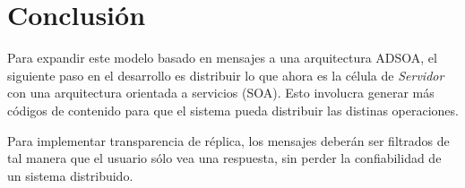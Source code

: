 \documentclass[conference,compsoc]{IEEEtran}
\begin{document}
\section{Conclusión}

Para expandir este modelo basado en mensajes a una arquitectura ADSOA, el siguiente paso en el desarrollo es distribuir lo que ahora es la célula de \emph{Servidor} con una arquitectura orientada a servicios (SOA). Esto involucra generar más códigos de contenido para que el sistema pueda distribuir las distinas operaciones.

Para implementar transparencia de réplica, los mensajes deberán ser filtrados de tal manera que el usuario sólo vea una respuesta, sin perder la confiabilidad de un sistema distribuido.

\newpage
\printbibliography
\end{document}
